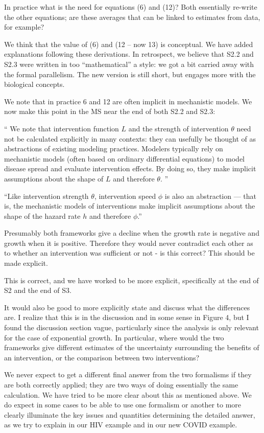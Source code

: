 \documentclass[12pt]{article}
\newcommand{\revtext}{\textsf}
\begin{document}
\revtext{
In practice what is the need for equations (6) and (12)? Both
essentially re-write the other equations; are these averages that can be
linked to estimates from data, for example?
}

We think that the value of (6) and (12 -- now 13) is conceptual. We have
added explanations following these derivations. In retrospect, we
believe that S2.2 and S2.3 were written in too ``mathematical'' a
style: we got a bit carried away with the formal parallelism. The new
version is still short, but engages more with the biological concepts.

We note that in practice 6 and 12 are often implicit in mechanistic models. We now make this point in the MS near the end of both S2.2 and S2.3:

``
We note that intervention function $L$ and the strength of intervention $\theta$ need not be calculated explicitly in many contexts: they can usefully be thought of as abstractions of existing modeling practices.
Modelers typically rely on mechanistic models (often based on ordinary differential equations) to model disease spread and evaluate intervention effects.
By doing so, they make implicit assumptions about the shape of $L$ and therefore $\theta$.
''

``Like intervention strength $\theta$, intervention speed $\phi$ is also an abstraction --- that is, the mechanistic models of interventions make implicit assumptions about the shape of the hazard rate $h$ and therefore $\phi$.''

\revtext{
Presumably both frameworks give a decline when the growth rate is
negative and growth when it is positive. Therefore they would never
contradict each other as to whether an intervention was sufficient or
not - is this correct? This should be made explicit.
}

This is correct, and we have worked to be more explicit, specifically at the end of S2 and the end of S3.

\revtext{
It would also be good to more explicitly state and discuss what the
differences are. I realize that this is in the discussion and in some
sense in Figure 4, but I found the discussion section vague,
particularly since the analysis is only relevant for the case of
exponential growth. In particular, where would the two frameworks give
different estimates of the uncertainty surrounding the benefits of an
intervention, or the comparison between two interventions?
}

We never expect to get a different final answer from the two formalisms if they are both correctly applied;
they are two ways of doing essentially the same calculation. 
We have tried to be more clear about this as mentioned above. 
We do expect in some cases to be able to use one formalism or another to more clearly illuminate the key issues and quantities determining the detailed answer, as we try to explain in our HIV example and in our new COVID example.
\end{document}

